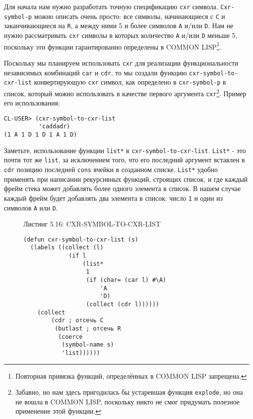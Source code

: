 Для начала нам нужно разработать точную спецификацию \verb|cxr| символа. \verb|Cxr-symbol-p| можно описать очень просто: все символы, начинающиеся с \verb|C| и заканчивающиеся на \verb|R|, а между ними 5 и более символов \verb|A| и/или \verb|D|. Нам не нужно рассматривать \verb|cxr| символы в которых количество \verb|A| и/или \verb|D| меньше 5, поскольку эти функции гарантированно определены в COMMON LISP\footnote{Повторная привязка функций, определённых в COMMON LISP запрещена.}.



Поскольку мы планируем использовать \verb"cxr" для реализации функциональности независимых комбинаций \verb"car" и \verb"cdr", то мы создали функцию \verb"cxr-symbol-to-cxr-list" конвертирующую \verb"cxr" символ, как определено в \verb"cxr-symbol-p" в список, который можно использовать в качестве первого аргумента \verb"cxr"\footnote{Забавно, но нам здесь пригодилась бы устаревшая функция \verb"explode", но она не вошла в COMMON LISP, поскольку никто не смог придумать полезное применение этой функции.}. Пример его использования:



\begin{verbatim}
CL-USER> (cxr-symbol-to-cxr-list
          'caddadr)
(1 A 1 D 1 D 1 A 1 D)
\end{verbatim}

Заметьте, использование функции \verb"list*" в \verb"cxr-symbol-to-cxr-list". \verb"List*" - это почти тот же \verb"list", за исключением того, что его последний аргумент вставлен в \verb"cdr" позицию последней \verb"cons" ячейки в созданном списке. \verb"List*" удобно применять при написании рекурсивных функций, строящих список, и где каждый фрейм стека может добавлять более одного элемента в список. В нашем случае каждый фрейм будет добавлять два элемента в список: число \verb"1" и один из символов \verb"A" или \verb"D".

\begin{figure}Листинг 5.16: CXR-SYMBOL-TO-CXR-LIST\label{listing_5.16}
\listbegin
\begin{verbatim}
(defun cxr-symbol-to-cxr-list (s)
  (labels ((collect (l)
             (if l
                 (list*
                  1
                  (if (char= (car l) #\A)
                      'A
                      'D)
                  (collect (cdr l))))))
    (collect
        (cdr ; отсечь C
         (butlast ; отсечь R
          (coerce
           (symbol-name s)
           'list))))))
\end{verbatim}
\listend
\end{figure}


